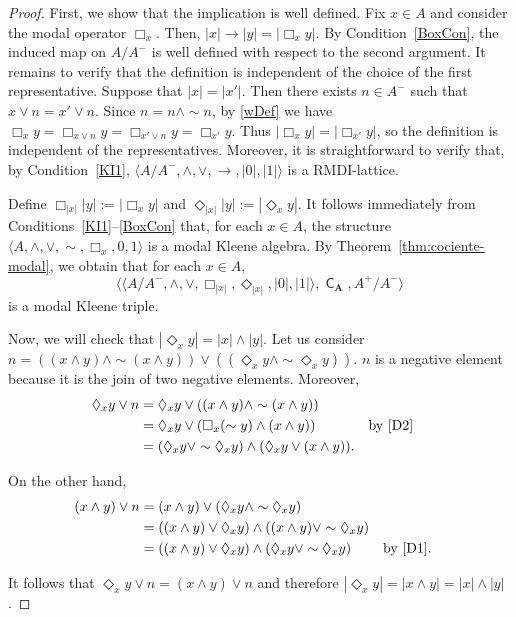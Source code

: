 \documentclass{article}
\DeclareMathOperator{\con}{\mathsf{C}}
\begin{document}
\begin{proof}
First, we show that the implication is well defined. Fix $x\in A$ and consider the modal operator $\Box_x$. Then, $|x| \to |y|=|\Box_x y|$. By Condition~\eqref{BoxCon}, the induced map on $A/A^{-}$ is well defined with respect to the second argument. It remains to verify that the definition is independent of the choice of the first representative. Suppose that $|x|=|x'|$. Then there exists $n\in A^{-}$ such that $x \vee n = x' \vee n$. Since $n = n \wedge \sim n$, by \eqref{wDef} we have $\Box_x y = \Box_{x \vee n}y=\Box_{x' \vee n}y=\Box_{x'}y$. Thus $|\Box_x y| = |\Box_{x'} y|$, so the definition is independent of the representatives. Moreover, it is straightforward to verify that, by Condition~\eqref{KI1}, $\langle A/A^{-},\wedge,\vee,\to,|0|,|1|\rangle$ is a RMDI-lattice.

Define $\Box_{|x|}|y|:=|\Box_xy|$ and $\Diamond_{|x|}|y|:=|\Diamond_xy|$. It follows immediately from Conditions~\eqref{KI1}--\eqref{BoxCon} that, for each $x\in A$, the structure $\langle A,\wedge,\vee,\sim,\Box_x,0,1\rangle$ is a modal Kleene algebra. By Theorem~\ref{thm:cociente-modal}, we obtain that for each $x\in A$, $$\langle \langle A/A^{-},\wedge,\vee,\Box_{|x|},\Diamond_{|x|},|0|,|1|\rangle, \con_{\mathbf{A}},A^+/A^{-}\rangle$$ is a modal Kleene triple.

Now, we will check that $|\Diamond_xy|=|x|\wedge|y|$. Let us consider $n=((x\wedge y)\wedge \sim (x\wedge y))\vee ((\Diamond_xy\wedge\sim \Diamond_xy))$. $n$ is a negative element because it is the join of two negative elements. Moreover,
\[
\begin{aligned}
\Diamond_xy\vee n
&=\Diamond_xy
  \vee((x\wedge y)\wedge\sim(x\wedge y))\\
&=\Diamond_xy
  \vee(\Box_x(\sim y)\wedge(x\wedge y))
  &&\text{by \eqref{D2}}\\
&=(\Diamond_xy\vee\sim\Diamond_xy)
  \wedge(\Diamond_xy\vee(x\wedge y)).
\end{aligned}
\]

On the other hand,
\[
\begin{aligned}
(x\wedge y)\vee n
&=(x\wedge y)\vee(\Diamond_xy\wedge\sim\Diamond_xy)\\
&=((x\wedge y)\vee\Diamond_xy)
  \wedge((x\wedge y)\vee\sim\Diamond_xy)\\
&=((x\wedge y)\vee\Diamond_xy)
  \wedge(\Diamond_xy\vee\sim\Diamond_xy) &&\text{by \eqref{D1}.}\\
\end{aligned}
\]

It follows that $ \Diamond_xy\vee n=(x\wedge y)\vee n$ and therefore $|\Diamond_x y|=|x\wedge y|=|x|\wedge|y|$.

\end{proof}
\end{document}
